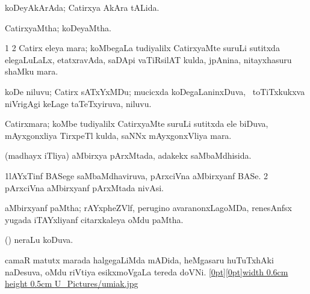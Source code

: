 {\bentry
{} 
\gl{\gu}
\expl{}
\bmng
koDeyAkArAda; Catirxya AkAra tALida. 
\emng
\eentry

\bentry
{} 
\gl{\gu}
\expl{}
\bmng
CatirxyaMtha; koDeyaMtha. 
\emng
\eentry

\bentry
{}
\gl{\nA}
\expl{}
\bmng
\bnum
\num{1}  
\num{2} Catirx eleya mara; koMbegaLa tudiyalilx CatirxyaMte suruLi sutitxda elegaLuLaLx, etatxravAda, saDApi vaTiRsilAT kulda, jpAnina, nitayxhasuru shaMku mara. 
\enum
\emng
\eentry

\bentry
{}
\gl{\nA}
\expl{}
\bmng
{} 
\emng
\eentry

\bentry
{}
\gl{\nA}
\expl{}
\bmng
koDe niluvu; Catirx sATxYxMDu; mucicxda koDegaLaninxDuva, \sA\ toTiTxkukxva niVrigAgi keLage taTeTxyiruva, niluvu. 
\emng
\eentry

\bentry
{}
\gl{\nA}
\expl{}
\bmng
Catirxmara; koMbe tudiyalilx CatirxyaMte suruLi sutitxda ele biDuva, mAyxgonxliya TirxpeTl kulda, saNNx mAyxgonxVliya mara. 
\emng
\eentry

\bentry
{} 
\gl{\gu}
\expl{}
\bmng
(madhayx iTliya) aMbirxya pArxMtada, adakekx saMbaMdhisida. 
\emng
\eentry

\bentry
{} 
\gl{\nA}
\expl{}
\bmng
\bnum
\num{1}lAYxTinf BASege saMbaMdhaviruva, pArxciVna aMbirxyanf BASe. 
\num{2} pArxciVna aMbirxyanf pArxMtada nivAsi. 
\enum
\emng
\eentry

\bentry
{}
\gl{\nA}
\expl{}
\bmng
aMbirxyanf paMtha; rAYxpheZVlf, perugino avaranonxLagoMDa, renesAnfsx yugada iTAYxliyanf citarxkaleya oMdu paMtha. 
\emng
\eentry

\bentry
{} 
\gl{\gu}
\expl{}
\bmng
(\aupa) neraLu koDuva. 
\emng
\eentry

\bentry
{} 
\gl{\nA}
\expl{}
\bmng
camaR matutx marada halgegaLiMda mADida, heMgasaru huTuTxhAki naDesuva, oMdu riVtiya esikxmoVgaLa tereda doVNi. \quad\hyperlink{umiakfigure}{\raisebox{-0.15cm}[0pt][0pt]{\pdfimage width 0.6cm height 0.5cm {U_Pictures/umiak.jpg}}} 
\emng
\eentry

}
